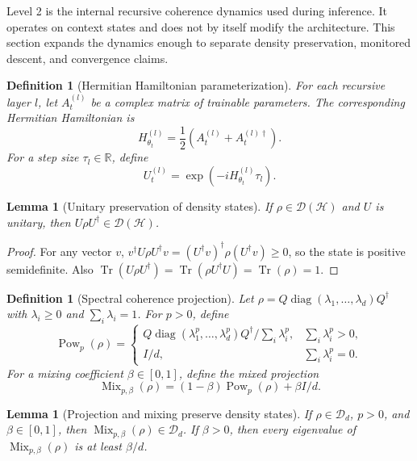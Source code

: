 \documentclass[11pt,a4paper]{article}
\newtheorem{lemma}[theorem]{Lemma}
\newtheorem{definition}[theorem]{Definition}
\newcommand{\D}{\mathcal D}
\newcommand{\Hcal}{\mathcal H}
\newcommand{\Tr}{\operatorname{Tr}}
\begin{document}
Level 2 is the internal recursive coherence dynamics used during inference.  It operates on context states and does not by itself modify the architecture.  This section expands the dynamics enough to separate density preservation, monitored descent, and convergence claims.

\begin{definition}[Hermitian Hamiltonian parameterization]
For each recursive layer \(l\), let \(A_{t}^{(l)}\) be a complex matrix of trainable parameters.  The corresponding Hermitian Hamiltonian is
\[
H_{\theta_t}^{(l)}=\frac12(A_t^{(l)}+A_t^{(l)\dagger}).
\]
For a step size \(\tau_l\in\mathbb R\), define
\[
U_t^{(l)}=\exp(-iH_{\theta_t}^{(l)}\tau_l).
\]
\end{definition}

\begin{lemma}[Unitary preservation of density states]
\label{lem:unitary-density}
If \(\rho\in\D(\Hcal)\) and \(U\) is unitary, then \(U\rho U^{\dagger}\in\D(\Hcal)\).
\end{lemma}

\begin{proof}
For any vector \(v\), \(v^{\dagger}U\rho U^{\dagger}v=(U^{\dagger}v)^{\dagger}\rho(U^{\dagger}v)\ge0\), so the state is positive semidefinite.  Also \(\Tr(U\rho U^{\dagger})=\Tr(\rho U^{\dagger}U)=\Tr(\rho)=1\).
\end{proof}

\begin{definition}[Spectral coherence projection]
Let \(\rho=Q\operatorname{diag}(\lambda_1,\ldots,\lambda_d)Q^{\dagger}\) with \(\lambda_i\ge0\) and \(\sum_i\lambda_i=1\).  For \(p>0\), define
\[
\operatorname{Pow}_p(\rho)=
\begin{cases}
Q\operatorname{diag}(\lambda_1^p,\ldots,\lambda_d^p)Q^{\dagger}/\sum_i\lambda_i^p,&\sum_i\lambda_i^p>0,\\[0.8em]
I/d,&\sum_i\lambda_i^p=0.
\end{cases}
\]
For a mixing coefficient \(\beta\in[0,1]\), define the mixed projection
\[
\operatorname{Mix}_{p,\beta}(\rho)=(1-\beta)\operatorname{Pow}_p(\rho)+\beta I/d.
\]
\end{definition}

\begin{lemma}[Projection and mixing preserve density states]
\label{lem:projection-density}
If \(\rho\in\D_d\), \(p>0\), and \(\beta\in[0,1]\), then \(\operatorname{Mix}_{p,\beta}(\rho)\in\D_d\).  If \(\beta>0\), then every eigenvalue of \(\operatorname{Mix}_{p,\beta}(\rho)\) is at least \(\beta/d\).
\end{lemma}
\end{document}
